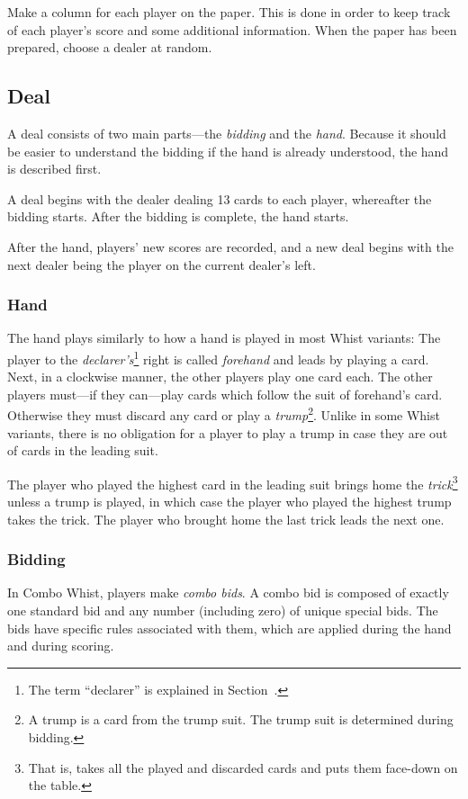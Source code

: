 \documentclass[a4paper]{article} %
\begin{document}
	Make a column for each player on the paper. This is done in order to keep track of each player's score and some additional information. When the paper has been prepared, choose a dealer at random.

	\subsection{Deal}
	A deal consists of two main parts---the \emph{bidding} and the \emph{hand}. Because it should be easier to understand the bidding if the hand is already understood, the hand is described first.

	A deal begins with the dealer dealing 13 cards to each player, whereafter the bidding starts. After the bidding is complete, the hand starts.

	After the hand, players' new scores are recorded, and a new deal begins with the next dealer being the player on the current dealer's left.

	\subsubsection{Hand}
	The hand plays similarly to how a hand is played in most Whist variants: The player to the \emph{declarer's}\footnote{The term ``declarer'' is explained in Section~.} right is called \emph{forehand} and leads by playing a card. Next, in a clockwise manner, the other players play one card each. The other players must---if they can---play cards which follow the suit of forehand's card. Otherwise they must discard any card or play a \emph{trump}\footnote{A trump is a card from the trump suit. The trump suit is determined during bidding.}. Unlike in some Whist variants, there is no obligation for a player to play a trump in case they are out of cards in the leading suit.

	The player who played the highest card in the leading suit brings home the \emph{trick}\footnote{That is, takes all the played and discarded cards and puts them face-down on the table.} unless a trump is played, in which case the player who played the highest trump takes the trick. The player who brought home the last trick leads the next one.

	\subsubsection{Bidding}
	\label{sec:bidding}
	In Combo Whist, players make \emph{combo bids}. A combo bid is composed of exactly one standard bid and any number (including zero) of unique special bids. The bids have specific rules associated with them, which are applied during the hand and during scoring.
\end{document}
